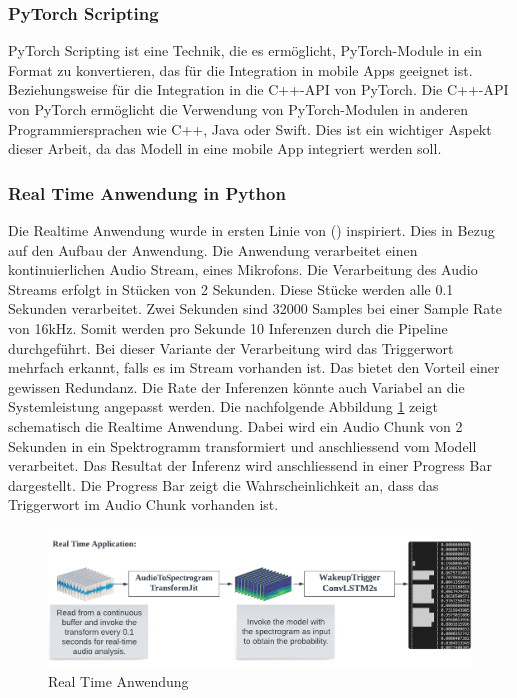 \documentclass[11pt,a4paper]{article}
\begin{document}
\subsubsection{PyTorch Scripting}
PyTorch Scripting ist eine Technik, die es ermöglicht, PyTorch-Module in ein Format zu konvertieren, 
das für die Integration in mobile Apps geeignet ist. Beziehungsweise für die Integration in die 
C++-API von PyTorch. Die C++-API von PyTorch ermöglicht die Verwendung von PyTorch-Modulen in 
anderen Programmiersprachen wie C++, Java oder Swift. Dies ist ein wichtiger Aspekt dieser Arbeit, 
da das Modell in eine mobile App integriert werden soll.

\subsubsection{Real Time Anwendung in Python}
Die Realtime Anwendung wurde in ersten Linie von (\cite{siri2017hey}) inspiriert. Dies in Bezug 
auf den Aufbau der Anwendung. Die Anwendung verarbeitet einen kontinuierlichen Audio Stream, eines 
Mikrofons. Die Verarbeitung des Audio Streams erfolgt in Stücken von 2 Sekunden. Diese Stücke werden 
alle 0.1 Sekunden verarbeitet. Zwei Sekunden sind 32000 Samples bei einer Sample Rate von 16kHz. 
Somit werden pro Sekunde 10 Inferenzen durch die Pipeline durchgeführt. Bei dieser Variante der 
Verarbeitung wird das Triggerwort mehrfach erkannt, falls es im Stream vorhanden ist. Das bietet den Vorteil einer gewissen Redundanz. Die Rate der Inferenzen könnte 
auch Variabel an die Systemleistung angepasst werden. Die nachfolgende Abbildung 
\ref{fig:realtime-application} zeigt schematisch die Realtime Anwendung. Dabei wird ein Audio Chunk 
von 2 Sekunden in ein Spektrogramm transformiert und anschliessend vom Modell verarbeitet. Das 
Resultat der Inferenz wird anschliessend in einer Progress Bar dargestellt. Die Progress Bar zeigt 
die Wahrscheinlichkeit an, dass das Triggerwort im Audio Chunk vorhanden ist. 

\begin{figure}[H]
	\centering
	\includegraphics[width=1.0\linewidth, trim=0 10pt 0 10pt, clip]{img/realtime-application.pdf}
	\caption{Real Time Anwendung}
	\label{fig:realtime-application}
\end{figure}
\end{document}
